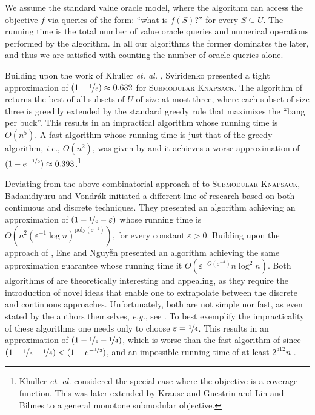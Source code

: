 \documentclass[a4paper,UKenglish,cleveref, autoref]{lipics-v2019}
\newcommand{\SK}{{\textsc{Submodular Knapsack}}\xspace}
\begin{document}
We assume the standard value oracle model, where the algorithm can access the objective $f$ via queries of the form: ``what is $f(S)$?'' for every $S\subseteq U$.
The running time is the total number of value oracle queries and numerical operations performed by the algorithm. In all our algorithms the former dominates the later, and thus we are satisfied with counting the number of oracle queries alone.

Building upon the work of Khuller {\em et. al.} \cite{khuller1999budgeted}, Sviridenko \cite{sviridenko2004note} presented a tight approximation of $(1-\nicefrac[]{1}{e})\approx 0.632$ for \SK.
The algorithm of \cite{sviridenko2004note} returns the best of all subsets of $U$ of size at most three, where each subset of size three is greedily extended by the standard greedy rule that maximizes the ``bang per buck''.
This results in an impractical algorithm whose running time is $O(n^5)$.
A fast algorithm whose running time is just that of the greedy algorithm, {\em i.e.}, $O(n^2)$, was given by \cite{khuller1999budgeted} and it achieves a worse approximation of $(1-e^{-\nicefrac[]{1}{2}})\approx 0.393$.\footnote{Khuller {\em et. al.} \cite{khuller1999budgeted} considered the special case where the objective is a coverage function. This was later extended by Krause and Guestrin \cite{krause2005note} and Lin and Bilmes \cite{LB10} to a general monotone submodular objective.}


Deviating from the above combinatorial approach of \cite{khuller1999budgeted,sviridenko2004note} to \SK, Badanidiyuru and Vondr\'{a}k \cite{badanidiyuru2014fast} initiated a different line of research based on both continuous and discrete techniques.
They presented an algorithm achieving an approximation of $(1-\nicefrac[]{1}{e}-\varepsilon)$ whose running time is $O(n^2(\varepsilon ^{-1}\log n)^{\text{poly}(\varepsilon^{-1})})$, for every constant $\varepsilon >0$.
Building upon the approach of \cite{badanidiyuru2014fast}, Ene and Nguy\~{\^{e}}n \cite{Alina2017} presented an algorithm achieving the same approximation guarantee whose running time it $O(\varepsilon^{-O(\varepsilon^{-4})}n \log^2 n)$.
Both algorithms of \cite{badanidiyuru2014fast,Alina2017} are theoretically interesting and appealing, as they require the introduction of novel ideas that enable one to extrapolate between the discrete and continuous approaches.
Unfortunately, both are not simple nor fast, as even stated by the authors themselves, {\em e.g.}, see \cite{Alina2017}.
To best exemplify the impracticality of these algorithms one needs only to choose $\varepsilon = \nicefrac[]{1}{4}$.
This results in an approximation of $(1-\nicefrac[]{1}{e}-\nicefrac[]{1}{4})$, which is worse than the fast algorithm of \cite{khuller1999budgeted} since $(1-\nicefrac[]{1}{e}-\nicefrac[]{1}{4})<(1-e^{-\nicefrac[]{1}{2}})$, and an impossible running time of at least $2^{512} n$ \cite{Alina2017}.
\end{document}

